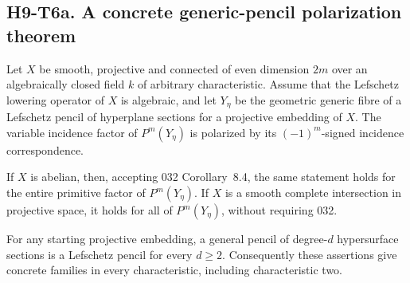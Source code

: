 
\subsection*{H9-T6a. A concrete generic-pencil polarization theorem}

\begin{theorem}[H9-T6a]
Let $X$ be smooth, projective and connected of even dimension $2m$
over an algebraically closed field $k$ of arbitrary characteristic.
Assume that the Lefschetz lowering operator of $X$ is algebraic, and
let $Y_\eta$ be the geometric generic fibre of a Lefschetz pencil of
hyperplane sections for a projective embedding of $X$.
The variable incidence factor of $P^m(Y_\eta)$ is polarized by its
$(-1)^m$-signed incidence correspondence.

If $X$ is abelian, then, accepting 032 Corollary~8.4, the same statement
holds for the entire primitive factor of $P^m(Y_\eta)$.
If $X$ is a smooth complete intersection in projective space, it holds
for all of $P^m(Y_\eta)$, without requiring 032.

For any starting projective embedding, a general pencil of degree-$d$
hypersurface sections is a Lefschetz pencil for every $d\ge2$.
Consequently these assertions give concrete families in every
characteristic, including characteristic two.
\end{theorem}

